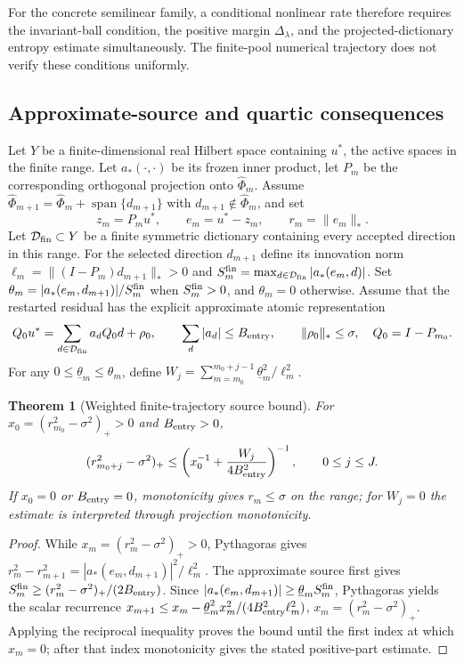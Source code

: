 \documentclass[11pt]{article}
\newtheorem{theorem}{Theorem}[section]
\theoremstyle{remark}\newtheorem{remark}[theorem]{Remark}
\begin{document}
For the concrete semilinear family, a conditional nonlinear rate therefore requires
the invariant-ball condition, the positive margin $\Delta_\lambda$, and the
projected-dictionary entropy estimate simultaneously.  The finite-pool numerical
trajectory does not verify these conditions uniformly.

\subsection{Approximate-source and quartic consequences}
\label{sec:c5-source}

Let $Y$ be a finite-dimensional real Hilbert space containing $u^*$, the
active spaces in the finite range.  Let $a_*(\cdot,\cdot)$ be its frozen inner
product, let $P_m$ be the corresponding orthogonal projection onto
$\widehat\Phi_m$.  Assume
$\widehat\Phi_{m+1}=\widehat\Phi_m+\operatorname{span}\{d_{m+1}\}$ with
$d_{m+1}\notin\widehat\Phi_m$, and set
\[
 z_m=P_mu^*,\qquad e_m=u^*-z_m,\qquad r_m=\|e_m\|_*.
\]
Let $\mathcal D_{\rm fin}\subset Y$ be a finite symmetric dictionary containing every accepted direction in this range.
For the selected direction $d_{m+1}$ define its innovation norm
$\ell_m=\|(I-P_m)d_{m+1}\|_*>0$ and
$S_m^{\rm fin}=\max_{d\in\mathcal D_{\rm fin}}|a_*(e_m,d)|$.
Set $\theta_m=|a_*(e_m,d_{m+1})|/S_m^{\rm fin}$ when
$S_m^{\rm fin}>0$, and $\theta_m=0$ otherwise.  Assume that the restarted
residual has the explicit approximate atomic representation
\[
 Q_0u^*=\sum_{d\in\mathcal D_{\rm fin}}a_dQ_0d+\rho_0,
 \qquad \sum_d|a_d|\leq B_{\rm entry},\qquad \|\rho_0\|_*\leq\sigma,
 \quad Q_0=I-P_{m_0}.
\]
For any $0\leq\underline\theta_m\leq\theta_m$, define
$W_j=\sum_{m=m_0}^{m_0+j-1}\underline\theta_m^2/\ell_m^2$.

\begin{theorem}[Weighted finite-trajectory source bound]
\label{thm:c5-source}
For $x_0=(r_{m_0}^2-\sigma^2)_+>0$ and $B_{\rm entry}>0$,
\begin{equation}
 (r_{m_0+j}^2-\sigma^2)_+
 \leq\left(x_0^{-1}+\frac{W_j}{4B_{\rm entry}^2}\right)^{-1},
 \qquad 0\le j\le J.
 \label{eq:c5-source-initial}
\end{equation}
If $x_0=0$ or $B_{\rm entry}=0$, monotonicity gives $r_m\leq\sigma$ on the range;
for $W_j=0$ the estimate is interpreted through projection monotonicity.
\end{theorem}
\begin{proof}
While $x_m=(r_m^2-\sigma^2)_+>0$, Pythagoras gives
$r_m^2-r_{m+1}^2=|a_*(e_m,d_{m+1})|^2/\ell_m^2$.
The approximate source first gives
$S_m^{\rm fin}\ge (r_m^2-\sigma^2)_+/(2B_{\rm entry})$.
Since $|a_*(e_m,d_{m+1})|\ge\underline\theta_m S_m^{\rm fin}$,
Pythagoras yields the scalar recurrence
$x_{m+1}\le x_m-\underline\theta_m^2x_m^2/(4B_{\rm entry}^2\ell_m^2)$,
$x_m=(r_m^2-\sigma^2)_+$. Applying the reciprocal inequality proves the bound
until the first index at which $x_m=0$; after that index monotonicity gives the
stated positive-part estimate.
\end{proof}
\end{document}
